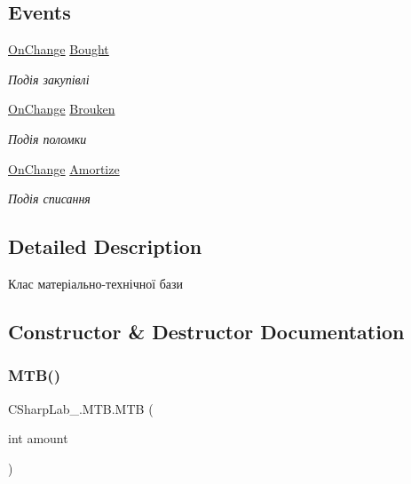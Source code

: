 \subsection*{Events}
\begin{DoxyCompactItemize}
\item 
\hyperlink{class_c_sharp_lab__1_1_1_m_t_b_af571bf7359805b314bd1535dede971e2}{On\+Change} \hyperlink{class_c_sharp_lab__1_1_1_m_t_b_ae07bfca3c3f690f17960215d7570d247}{Bought}
\begin{DoxyCompactList}\small\item\em Подія закупівлі \end{DoxyCompactList}\item 
\hyperlink{class_c_sharp_lab__1_1_1_m_t_b_af571bf7359805b314bd1535dede971e2}{On\+Change} \hyperlink{class_c_sharp_lab__1_1_1_m_t_b_a98818a5eca5d6356b98673aa004532d9}{Brouken}
\begin{DoxyCompactList}\small\item\em Подія поломки \end{DoxyCompactList}\item 
\hyperlink{class_c_sharp_lab__1_1_1_m_t_b_af571bf7359805b314bd1535dede971e2}{On\+Change} \hyperlink{class_c_sharp_lab__1_1_1_m_t_b_a7b0c9b5105656ce802a60a45128bde81}{Amortize}
\begin{DoxyCompactList}\small\item\em Подія списання \end{DoxyCompactList}\end{DoxyCompactItemize}


\subsection{Detailed Description}
Клас матеріально-\/технічної бази 



\subsection{Constructor \& Destructor Documentation}
\hypertarget{class_c_sharp_lab__1_1_1_m_t_b_a795c8d94ca1b20c77870728ae387d302}{}\label{class_c_sharp_lab__1_1_1_m_t_b_a795c8d94ca1b20c77870728ae387d302} 
\subsubsection{\texorpdfstring{M\+T\+B()}{MTB()}}
{\footnotesize\ttfamily C\+Sharp\+Lab\+\_.\+M\+T\+B.\+M\+TB (\begin{DoxyParamCaption}\item[{int}]{amount }\end{DoxyParamCaption})}



